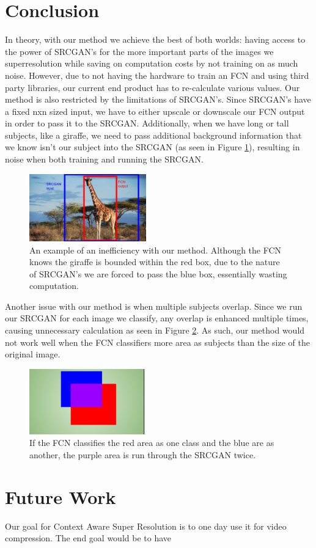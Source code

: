 \section{Conclusion}

In theory, with our method we achieve the best of both worlds: having access to the power of SRCGAN’s for the more important parts of the images we superresolution while saving on computation costs by not training on as much noise. However, due to not having the hardware to train an FCN and using third party libraries, our current end product has to re-calculate various values.
Our method is also restricted by the limitations of SRCGAN’s. Since SRCGAN’s
have a fixed nxn sized input, we have to either upscale or downscale our FCN
output in order to pass it to the SRCGAN. Additionally, when we have long or
tall subjects, like a giraffe, we need to pass additional background information
that we know isn’t our subject into the SRCGAN (as seen in Figure \ref{fig:giraffe}), resulting in
noise when both training and running the SRCGAN.

\begin{figure}
    \centering
    \includegraphics[width=0.45\textwidth]{images/giraffe.png}
    \caption{An example of an inefficiency with our method. Although the FCN knows the giraffe is bounded within the red box, due to the nature of SRCGAN's we are forced to pass the blue box, essentially wasting computation.}
    \label{fig:giraffe}
\end{figure}


Another issue with our method is when multiple subjects overlap. Since we run our SRCGAN for each image we classify, any overlap is enhanced multiple times, causing unnecessary calculation as seen in Figure \ref{fig:crossover}. As such, our method would not work well when the FCN classifiers more area as subjects than the size of the original image.

\begin{figure}
    \centering
    \includegraphics[width=0.45\textwidth]{images/crossover.png}
    \caption{If the FCN classifies the red area as one class and the blue are as another, the purple area is run through the SRCGAN twice.}
    \label{fig:crossover}
\end{figure}


\section{Future Work}

Our goal for Context Aware Super Resolution is to one day use it for video compression. The end goal would be to have 

